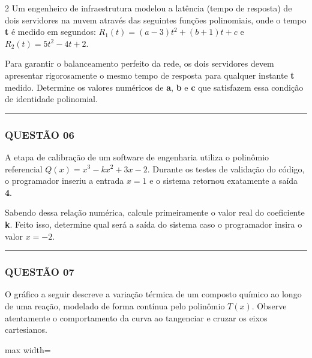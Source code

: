 \documentclass[twoside, 10pt, a4paper]{article}
\begin{document}
\begin{multicols*}{2}
Um engenheiro de infraestrutura modelou a latência (tempo de resposta) de dois servidores na nuvem através das seguintes funções polinomiais, onde o tempo \textbf{t} é medido em segundos:
$ R_1(t) = (a - 3)t^2 + (b + 1)t + c $ e $ R_2(t) = 5t^2 - 4t + 2 $. 

Para garantir o balanceamento perfeito da rede, os dois servidores devem apresentar rigorosamente o mesmo tempo de resposta para qualquer instante \textbf{t} medido. Determine os valores numéricos de \textbf{a}, \textbf{b} e \textbf{c} que satisfazem essa condição de identidade polinomial.

\vspace{0cm} \noindent\textcolor{CorLinha}{\rule{\linewidth}{0.5pt}} \vspace{-0.2cm}
\subsubsection*{QUESTÃO 06}

A etapa de calibração de um software de engenharia utiliza o polinômio referencial $ Q(x) = x^3 - kx^2 + 3x - 2 $. Durante os testes de validação do código, o programador inseriu a entrada $ x = 1 $ e o sistema retornou exatamente a saída \textbf{4}.

Sabendo dessa relação numérica, calcule primeiramente o valor real do coeficiente \textbf{k}. Feito isso, determine qual será a saída do sistema caso o programador insira o valor $ x = -2 $.

\vspace{0cm} \noindent\textcolor{CorLinha}{\rule{\linewidth}{0.5pt}} \vspace{-0.2cm}
\subsubsection*{QUESTÃO 07}

O gráfico a seguir descreve a variação térmica de um composto químico ao longo de uma reação, modelado de forma contínua pelo polinômio $ T(x) $. Observe atentamente o comportamento da curva ao tangenciar e cruzar os eixos cartesianos.

\begin{center}
\begin{adjustbox}{max width=\linewidth}
\end{adjustbox}
\end{center}
\end{multicols*}
\end{document}
